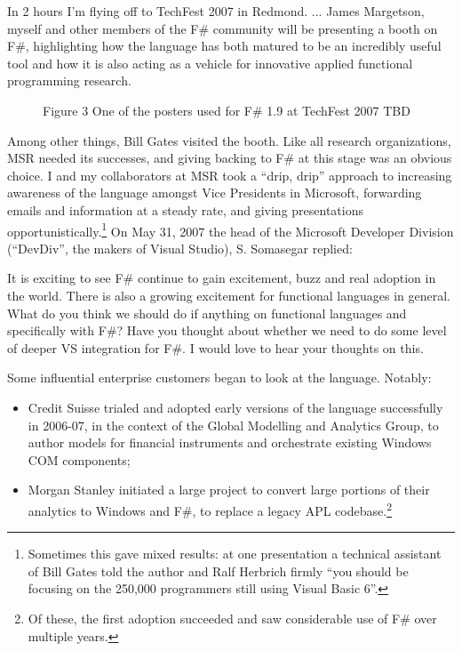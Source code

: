 \documentclass[acmsmall,review]{acmart}\settopmatter{printfolios=true,printccs=false,printacmref=false}
\begin{document}
\begin{verbquote}
In 2 hours I'm flying off to TechFest 2007 in Redmond. ... James Margetson, myself and other members of the F# community
will be presenting a booth on F#, highlighting how the language has both matured to be an incredibly useful tool and how it is
also acting as a vehicle for innovative applied functional programming research.
\end{verbquote}

\begin{figure}
Figure 3 One of the posters used for F\# 1.9 at TechFest 2007
TBD
\end{figure}

Among other things, Bill Gates visited the booth. Like all research organizations, MSR needed its successes, and
giving backing to F\# at this stage was an obvious choice. I and my collaborators at MSR took a “drip, drip” approach
to increasing awareness of the language amongst Vice Presidents in Microsoft, forwarding emails and information at
a steady rate, and giving presentations opportunistically.\footnote{Sometimes this gave mixed results: at one presentation
a technical assistant of Bill Gates told the author and Ralf Herbrich firmly “you should be focusing on the 250,000 programmers still using Visual Basic 6”.}   On May 31,
2007 the head of the Microsoft Developer Division (“DevDiv”, the makers of Visual Studio), S. Somasegar replied:

\begin{verbquote}
It is exciting to see F\# continue to gain excitement, buzz and real adoption in the world. There is also a growing
excitement for functional languages in general. What do you think we should do if anything on functional languages
and specifically with F\#?  Have you thought about whether we need to do some level of deeper VS integration for F\#.  I would love to hear your thoughts on this.
\end{verbquote}
Some influential enterprise customers began to look at the language.  Notably:

\begin{itemize}
\item Credit Suisse trialed and adopted early versions of the language successfully in 2006-07, in the context
of the Global Modelling and Analytics Group, to author models for financial instruments and orchestrate existing Windows COM components;
\item Morgan Stanley initiated a large project to convert large portions of their analytics to Windows and F\#, to
replace a legacy APL codebase.\footnote{Of these, the first adoption succeeded and saw considerable use of F\# over multiple years.}
\end{itemize}
\end{document}
